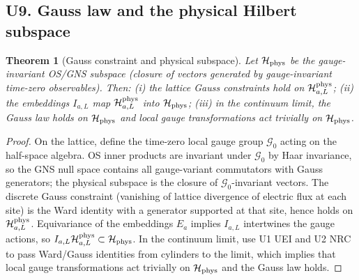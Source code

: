 \documentclass[11pt]{amsart}
\theoremstyle{plain}
\newtheorem{theorem}{Theorem}[section]
\theoremstyle{definition}
\theoremstyle{remark}
\begin{document}
\subsection{U9. Gauss law and the physical Hilbert subspace}
\begin{theorem}[Gauss constraint and physical subspace]\label{thm:U9-gauss}
Let $\mathcal H_{\rm phys}$ be the gauge-invariant OS/GNS subspace (closure of vectors generated by gauge-invariant time-zero observables). Then: (i) the lattice Gauss constraints hold on $\mathcal H_{a,L}^{\rm phys}$; (ii) the embeddings $I_{a,L}$ map $\mathcal H_{a,L}^{\rm phys}$ into $\mathcal H_{\rm phys}$; (iii) in the continuum limit, the Gauss law holds on $\mathcal H_{\rm phys}$ and local gauge transformations act trivially on $\mathcal H_{\rm phys}$.
\end{theorem}
\begin{proof}
On the lattice, define the time-zero local gauge group $\mathcal G_0$ acting on the half-space algebra. OS inner products are invariant under $\mathcal G_0$ by Haar invariance, so the GNS null space contains all gauge-variant commutators with Gauss generators; the physical subspace is the closure of $\mathcal G_0$-invariant vectors. The discrete Gauss constraint (vanishing of lattice divergence of electric flux at each site) is the Ward identity with a generator supported at that site, hence holds on $\mathcal H_{a,L}^{\rm phys}$. Equivariance of the embeddings $E_a$ implies $I_{a,L}$ intertwines the gauge actions, so $I_{a,L} \mathcal H_{a,L}^{\rm phys}\subset\mathcal H_{\rm phys}$. In the continuum limit, use U1 UEI and U2 NRC to pass Ward/Gauss identities from cylinders to the limit, which implies that local gauge transformations act trivially on $\mathcal H_{\rm phys}$ and the Gauss law holds.
\end{proof}
\end{document}
